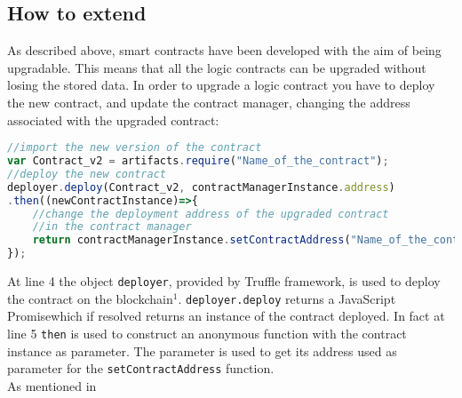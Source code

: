 \subsection{How to extend}
As described above, smart contracts have been developed with the aim of being upgradable. This means that all the logic contracts can be upgraded without losing the stored data. In order to upgrade a logic contract you have to deploy the new contract, and update the contract manager, changing the address associated with the upgraded contract:
\begin{lstlisting}[language=JavaScript]
//import the new version of the contract
var Contract_v2 = artifacts.require("Name_of_the_contract");
//deploy the new contract
deployer.deploy(Contract_v2, contractManagerInstance.address)
.then((newContractInstance)=>{
	//change the deployment address of the upgraded contract
	//in the contract manager
	return contractManagerInstance.setContractAddress("Name_of_the_contract", newContractInstance.address);
});
\end{lstlisting}
At line 4 the object \texttt{deployer}, provided by Truffle framework, is used to deploy the contract on the blockchain$^{1}$. \texttt{deployer.deploy} returns a JavaScript Promise\glosp which if resolved returns an instance of the contract deployed. In fact at line 5 \texttt{then} is used to construct an anonymous function with the contract instance as parameter. The parameter is used to get its address used as parameter for the \texttt{setContractAddress} function. \\
As mentioned in  


